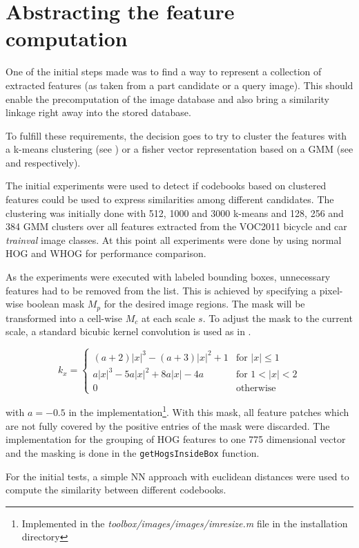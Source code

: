\section{Abstracting the feature computation}

One of the initial steps made was to find a way to represent a collection of extracted features (as taken from a part candidate or a query image). This should enable the precomputation of the image database and also bring a similarity linkage right away into the stored database.

To fulfill these requirements, the decision goes to try to cluster the features with a k-means clustering (see ) or a fisher vector representation based on a \acf{GMM} (see  and  respectively).
\par
The initial experiments were used to detect if codebooks based on clustered features could be used to express similarities among different candidates.
The clustering was initially done with 512, 1000 and 3000 k-means and 128, 256 and 384 \ac{GMM} clusters over all features extracted from the \ac{VOC2011} bicycle and car \textit{trainval} image classes.
At this point all experiments were done by using normal \ac{HOG} and \acl{WHOG} for performance comparison.
\par
As the experiments were executed with labeled bounding boxes, unnecessary features had to be removed from the list. This is achieved by specifying a pixel-wise boolean mask $M_p$ for the desired image regions. The mask will be transformed into a cell-wise $M_c$ at each scale $s$. To adjust the mask to the current scale, a standard bicubic kernel convolution is used as in .

\begin{equation}
k_x = \begin{cases}
(a+2)|x|^3-(a+3)|x|^2+1 & \text{for } |x| \leq 1 \\
a|x|^3-5a|x|^2+8a|x|-4a & \text{for } 1 < |x| < 2 \\
0                       & \text{otherwise}
\end{cases}
\label{eqn:bicubic_kernel}
\end{equation}

with $a=-0.5$ in the \MATLAB implementation\footnote{Implemented in the \textit{toolbox/images/images/imresize.m} file in the \MATLAB installation directory}. With this mask, all feature patches which are not fully covered by the positive entries of the mask were discarded. The implementation for the grouping of \ac{HOG} features to one 775 dimensional vector and the masking is done in the \verb|getHogsInsideBox| function.
\par
For the initial tests, a simple \acf{NN} approach with euclidean distances were used to compute the similarity between different codebooks.

